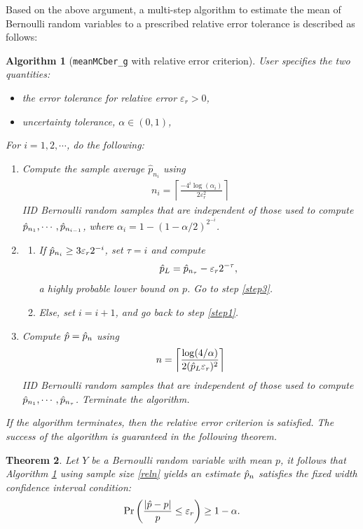 \documentclass{iitthesis}
\newtheorem{theorem}{Theorem}[section]
\newtheorem{algorithm}[theorem]{Algorithm}
\theoremstyle{definition}
\begin{document}
Based on the above argument, a multi-step algorithm to estimate the mean of Bernoulli random variables to a prescribed relative error tolerance is described as follows:
\begin{algorithm}[{\tt meanMCber\_g} with relative error criterion]\label{algrel}
User specifies the two quantities:
\begin{itemize}
\item the error tolerance for relative error $\varepsilon_r > 0$, 
\item uncertainty tolerance, $\alpha \in (0,1)$, 
\end{itemize}
For $i = 1,2,\cdots$, do the following:
\begin{enumerate}
\item \label{step1} 
Compute the sample average $\hat{p}_{n_i}$ using 
\begin{align}\label{relalgni}
n_i = \left \lceil \frac{-4^i \log\left ( \alpha_i \right)}{2\varepsilon_r^2}\right \rceil
\end{align}
 IID Bernoulli random samples that are independent of those used to compute
$\hat{p}_{n_1},\cdots,\hat{p}_{n_{i-1}}$, where $\alpha_i=1-(1-\alpha/2)^{2^{-i}}$.
\item \label{step2}
\begin{enumerate}
\item If $\hat{p}_{n_i} \geq 3\varepsilon_r 2^{-i}$, set $\tau=i$ and compute 
\begin{align}\label{def:hpl}
\hat{p}_L= \hat{p}_{n_\tau} - \varepsilon_r 2^{-\tau},
\end{align}
 a highly probable lower bound on $p$. Go to step \ref{step3}. 
\item Else, set $i = i+1$, and go back to step \ref{step1}.
\end{enumerate}
    \item \label{step3}
Compute $\hat{p} = \hat{p}_n$ using 
\begin{align}\label{reln}
n= \left \lceil \frac{\log (4/\alpha)}{2(\hat{p}_L\varepsilon_{r})^2} \right \rceil 
\end{align}
  IID Bernoulli random samples that are independent of those used to compute $\hat{p}_{n_1}, \cdots, \hat{p}_{n_\tau}$. Terminate the algorithm.
  \end{enumerate}
If the algorithm terminates, then the relative error criterion is satisfied. The success of the algorithm is guaranteed in the following theorem.
\end{algorithm}
\begin{theorem}
Let $Y$ be a Bernoulli random variable with mean $p$, it follows that Algorithm \ref{algrel} using sample size \eqref{reln} yields an estimate $\hat{p}_n$ satisfies the fixed width confidence interval condition:
\begin{align}\label{probrel}
\Pr\left(\frac{|\hat{p} -p|}{p} \leq \varepsilon_r \right) \geq 1-\alpha.
\end{align}
\end{theorem}
\end{document}

